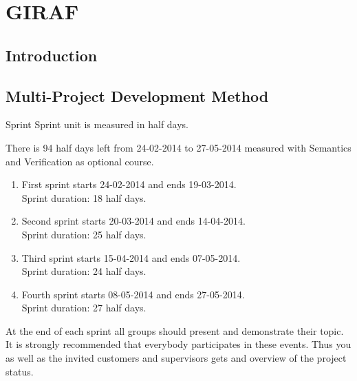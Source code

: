 \chapter{GIRAF}\label{chap:giraf}

\section{Introduction}

\section{Multi-Project Development Method}


Sprint
Sprint unit is measured in half days.

There is 94 half days left from 24-02-2014 to 27-05-2014 measured with Semantics and Verification as optional course.

\begin{enumerate}
\item First sprint starts 24-02-2014 and ends 19-03-2014.\\
Sprint duration: 18 half days.
\item Second sprint starts 20-03-2014 and ends 14-04-2014.\\
Sprint duration: 25 half days.
\item Third sprint starts 15-04-2014 and ends 07-05-2014.\\
Sprint duration: 24 half days.
\item Fourth sprint starts 08-05-2014 and ends 27-05-2014.\\
Sprint duration: 27 half days.
\end{enumerate}

At the end of each sprint all groups should present and demonstrate their topic.
It is strongly recommended that everybody participates in these events. Thus you as well as the invited customers and supervisors gets and overview of the project status.